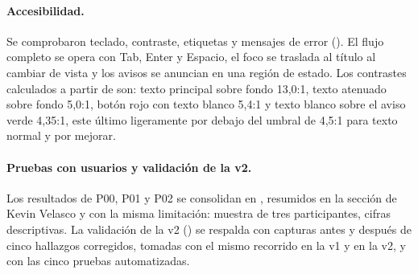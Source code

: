 \paragraph{Accesibilidad.} Se comprobaron teclado, contraste, etiquetas y mensajes de error (). El flujo completo se opera con Tab, Enter y Espacio, el foco se traslada al título al cambiar de vista y los avisos se anuncian en una región de estado. Los contrastes calculados a partir de  son: texto principal sobre fondo 13,0:1, texto atenuado sobre fondo 5,0:1, botón rojo con texto blanco 5,4:1 y texto blanco sobre el aviso verde 4,35:1, este último ligeramente por debajo del umbral de 4,5:1 para texto normal y por mejorar.

\paragraph{Pruebas con usuarios y validación de la v2.} Los resultados de P00, P01 y P02 se consolidan en , resumidos en la sección de Kevin Velasco y con la misma limitación: muestra de tres participantes, cifras descriptivas. La validación de la v2 () se respalda con capturas antes y después de cinco hallazgos corregidos, tomadas con el mismo recorrido en la v1 y en la v2, y con las cinco pruebas automatizadas.

